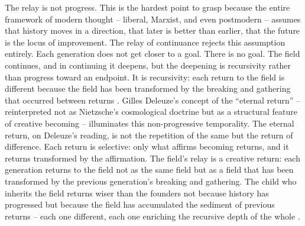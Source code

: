 The relay is not progress. This is the hardest point to grasp because the entire framework of modern thought – liberal, Marxist, and even postmodern – assumes that history moves in a direction, that later is better than earlier, that the future is the locus of improvement. The relay of continuance rejects this assumption entirely. Each generation does not get closer to a goal. There is no goal. The field continues, and in continuing it deepens, but the deepening is recursivity rather than progress toward an endpoint. It is recursivity: each return to the field is different because the field has been transformed by the breaking and gathering that occurred between returns \cite[pp.~1-30]{hui_2019}. Gilles Deleuze’s concept of the “eternal return” – reinterpreted not as Nietzsche’s cosmological doctrine but as a structural feature of creative becoming – illuminates this non-progressive temporality. The eternal return, on Deleuze’s reading, is not the repetition of the same but the return of difference. Each return is selective: only what affirms becoming returns, and it returns transformed by the affirmation. The field’s relay is a creative return: each generation returns to the field not as the same field but as a field that has been transformed by the previous generation’s breaking and gathering. The child who inherits the field returns wiser than the founders not because history has progressed but because the field has accumulated the sediment of previous returns – each one different, each one enriching the recursive depth of the whole \cite[pp.~293-303]{deleuze_1968}.


